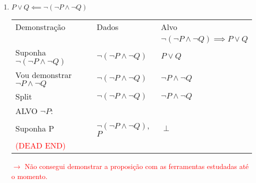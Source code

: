 \documentclass[a4paper, 12pt]{article}
\begin{document}
\begin{enumerate}
\begin{enumerate}[1.]
        \item $P \lor Q \impliedby \neg (\neg P \land \neg Q)$
        \begin{table}[h!]
            \centering
            \begin{tabular}{|p{4cm} | p{4cm} | p{4cm} |}
            \rowcolor{gray!50}
            Demonstração & Dados & Alvo \\
            &&$\neg (\neg P \land \neg Q)\implies P \lor Q$\\
            Suponha $\neg (\neg P \land \neg Q)$ & $\neg (\neg P \land \neg Q)$ & $P \lor Q$\\
            \rowcolor{red!25}
            Vou demonstrar $\neg P \land \neg Q$ & $\neg (\neg P \land \neg Q)$ & $\neg P \land \neg Q$\\
            \rowcolor{red!25}
            Split & $\neg (\neg P \land \neg Q)$ & $\neg P \land \neg Q$\\
            \hline
            \rowcolor{red!25}
            ALVO $\neg P$: & & \\
            \rowcolor{red!25}
            Suponha P & $\neg (\neg P \land \neg Q)$, $P$ & $\perp$\\
            \rowcolor{red!25}
            \textcolor{red}{(DEAD END)} & & \\
            \hline
            \end{tabular}
        \end{table}

        \textcolor{red}{$\rightarrow$ Não consegui demonstrar a proposição com as ferramentas estudadas até o momento.}
 

\end{enumerate}
\end{enumerate}
\end{document}
